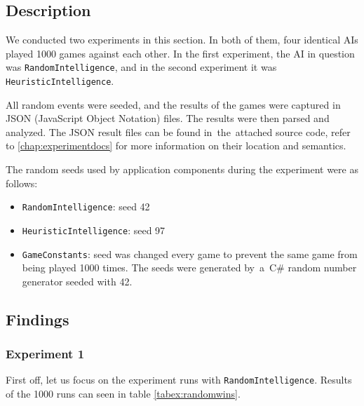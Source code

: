 \subsection{Description}

We conducted two experiments in this section. In both of them, four identical AIs
played 1000 games against each other. In the first experiment, the AI in question was
\texttt{RandomIntelligence}, and in the second
experiment it was \texttt{HeuristicIntelligence}.

All random events were seeded, and the results of the games were captured in JSON
(JavaScript Object Notation) files.
The results were then parsed and analyzed. The JSON result files can be found
in~the~attached source code, refer to \autoref{chap:experimentdocs} for more information
on their location and semantics.

The random seeds used by application components during the experiment were as follows:
\begin{itemize}
    \item \texttt{RandomIntelligence}: seed 42
    \item \texttt{HeuristicIntelligence}: seed 97
    \item \texttt{GameConstants}: seed was changed every game to prevent the same game from
        being played 1000 times. The seeds were generated by~a~C\# 
        random number generator seeded with 42.
\end{itemize}

\subsection{Findings}

\subsubsection{Experiment 1}

First off, let us focus on the experiment runs with \texttt{RandomIntelligence}.
Results of the 1000 runs can seen in table \ref{tabex:randomwins}.

